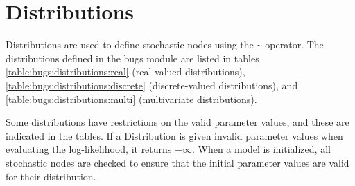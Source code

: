\documentclass[11pt, a4paper, titlepage]{report}
\begin{document}
\chapter{Distributions}
\label{section:distributions}

Distributions are used to define stochastic nodes using the \verb+~+
operator. The distributions defined in the bugs module are listed in
tables \ref{table:bugs:distributions:real} (real-valued distributions),
\ref{table:bugs:distributions:discrete} (discrete-valued
distributions), and \ref{table:bugs:distributions:multi}
(multivariate distributions).

Some distributions have restrictions on the valid parameter values,
and these are indicated in the tables. If a Distribution is
given invalid parameter values when evaluating the log-likelihood, it
returns $-\infty$. When a model is initialized, all stochastic nodes
are checked to ensure that the initial parameter values are valid for
their distribution.
\end{document}
